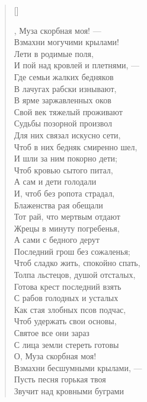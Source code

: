 \begin{verse}[\versewidth]
\begin{patverse*}
, Муза скорбная моя! ---\\
Взмахни могучими крылами!\\
Лети в родимые поля,\\
И пой над кровлей и плетнями, ---\\
Где семьи жалких бедняков\\
В лачугах рабски изнывают,\\
В ярме заржавленных оков\\
Свой век тяжелый проживают\ldotse\\
Судьбы позорной произвол\\
Для них связал искусно сети,\\
Чтоб в них бедняк смиренно шел,\\
И шли за ним покорно дети;\\
Чтоб кровью сытого питал,\\
А сам и дети голодали\ldotst\\
И, чтоб без ропота страдал,\\
Блаженства рая обещали\ldotst\\
Тот рай, что мертвым отдают\\
Жрецы в минуту погребенья,\\
А сами с бедного дерут\\
Последний грош без сожаленья;\\
Чтоб сладко жить, спокойно спать,\\
Толпа льстецов, душой отсталых,\\
Готова крест последний взять\\
С рабов голодных и усталых\ldotst\\
Как стая злобных псов подчас,\\
Чтоб удержать свои основы,\\
Святое все они зараз\\
С лица земли стереть готовы\ldotst\\
О, Муза скорбная моя!\\
Взмахни бесшумными крылами, ---\\
Пусть песня горькая твоя\\
Звучит над кровными буграми\ldotse
\end{patverse*}
\end{verse}


